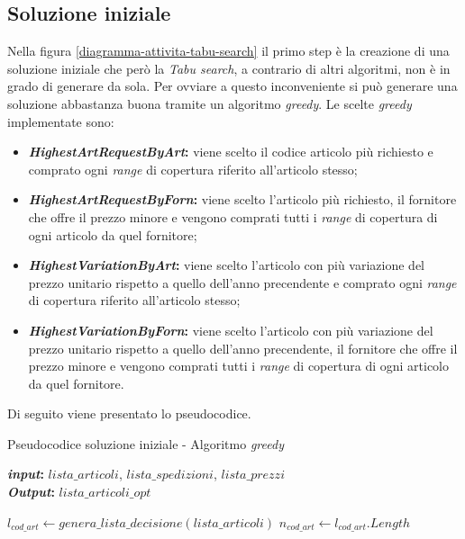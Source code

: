 \subsection{Soluzione iniziale}
\label{sec:soluzione-iniziale}
\noindent Nella figura \ref{diagramma-attivita-tabu-search} il primo step è la creazione di una soluzione iniziale che
però la \textit{Tabu search}, a contrario di altri algoritmi, non è in grado di generare da sola. Per ovviare a questo inconveniente
si può generare una soluzione abbastanza buona tramite un algoritmo \textit{greedy}.
Le scelte \textit{greedy} implementate sono:
\begin{itemize}
    \item \textbf{\textit{HighestArtRequestByArt}:} viene scelto
    il codice articolo più richiesto e comprato ogni
    \textit{range} di copertura riferito all'articolo stesso;
    \item \textbf{\textit{HighestArtRequestByForn}:} viene scelto
    l'articolo più richiesto, il fornitore che
    offre il prezzo minore e vengono comprati tutti i \textit{range}
    di copertura di ogni articolo
    da quel fornitore;
    \item \textbf{\textit{HighestVariationByArt}:} viene scelto
    l'articolo con più variazione del prezzo unitario rispetto a quello dell'anno
    precendente e comprato ogni
    \textit{range} di copertura riferito all'articolo stesso;
    \item \textbf{\textit{HighestVariationByForn}:} viene scelto
    l'articolo con più variazione del prezzo unitario rispetto a quello dell'anno
    precendente, il fornitore che
    offre il prezzo minore e vengono comprati tutti i \textit{range}
    di copertura di ogni articolo
    da quel fornitore.
\end{itemize}
Di seguito viene presentato lo pseudocodice.
\vspace*{\fill}
\begin{algorithm}
    \captionsetup{labelformat=empty}
    \caption{Pseudocodice soluzione iniziale - Algoritmo \textit{greedy}}
    \vspace{0.1cm}
    \hspace*{\algorithmicindent} \textbf{\textit{input}:} {$lista\_articoli$}, {$lista\_spedizioni$}, {$lista\_prezzi$}\\
    \hspace*{\algorithmicindent} \textbf{\textit{Output}:} {$lista\_articoli\_opt$}
    \begin{algorithmic}[1]
        \State $l_{cod\_art} \gets genera\_lista\_decisione(lista\_articoli)$
        \State $n_{cod\_art} \gets l_{cod\_art}.Length$
    \end{algorithmic}
\end{algorithm}
